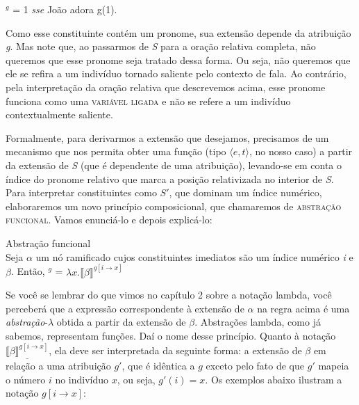 \begin{exe}
	\ex {}$^{g}$ = 1 \textit{sse} João adora g(1).
\end{exe}

\n Como esse constituinte contém um pronome, sua extensão depende
da atribuição \textit{g}. Mas note que, ao passarmos de
\textit{S} para a oração relativa completa, não queremos que esse pronome seja tratado
dessa forma. Ou seja, não queremos que ele se refira
a um indivíduo tornado saliente pelo contexto de fala. Ao
contrário, pela interpretação da oração relativa que descrevemos
acima, esse pronome funciona como uma \textsc{variável ligada} e não se refere a um indivíduo contextualmente saliente.

Formalmente, para derivarmos a extensão que desejamos,
precisamos de um mecanismo que nos permita obter uma função (tipo
$\langle e,t\rangle$, no nosso caso) a partir da extensão de
\textit{S} (que é dependente de uma atribuição), levando-se em
conta o índice do pronome relativo que marca a posição
relativizada no interior de \textit{S}. Para interpretar  constituintes como $S'$, que dominam um
índice numérico, elaboraremos um novo princípio composicional,
que chamaremos de \textsc{abstração funcional}. Vamos enunciá-lo e depois explicá-lo:

\begin{exe}
	\ex Abstração funcional \\
	Seja $\alpha$ um nó ramificado cujos constituintes imediatos são um índice numérico \textit{i} e $\beta$. Então, \den{$\alpha$}$^{g}$ = $\lambda x. \llbracket \beta \rrbracket^{g[i \rightarrow x]}$
\end{exe}



\n Se você se lembrar do que vimos no capítulo 2 sobre a notação lambda, você perceberá que a expressão correspondente à extensão de $\alpha$ na regra acima é uma \textit{abstração}-$\lambda$ obtida a partir da extensão de $\beta$. Abstrações lambda, como já sabemos, representam funções. Daí o nome desse princípio. Quanto à notação $\underline{\llbracket \beta \rrbracket^{g[i
\rightarrow x]}}$, ela deve ser interpretada da seguinte forma: a
extensão de $\beta $ em relação a uma atribuição $g'$,
que é idêntica a $g$ exceto pelo fato de que $g'$
mapeia o número $i$ no indivíduo $x$, ou seja, $g'(i)=x$. Os exemplos
abaixo ilustram a notação $g[{i \rightarrow x}]$:

